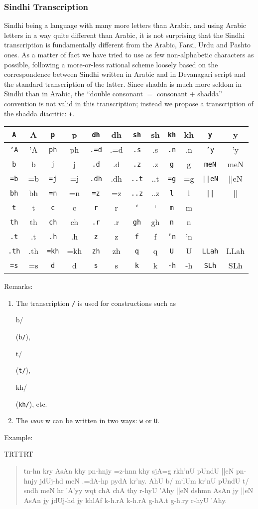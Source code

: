 \documentclass[a4paper,11pt]{article}
\def\shortarab#1{{\pushocplist\ArabicOCP\fontfamily{omarb}\selectfont#1\popocplist}}
\def\shortsindhi#1{{\pushocplist\SindhiOCP\fontfamily{omarb}\selectfont#1\popocplist}}
\def\stl#1#2#3#4#5#6{\hline\rule[-5pt]{0pt}{14pt}\texttt{#1}&\shortsindhi{#1}&\texttt{#2}&\shortsindhi{#2}&\texttt{#3}&\shortsindhi{#3}&
\texttt{#4}&\shortsindhi{#4}&\texttt{#5}&\shortsindhi{#5}&\texttt{#6}&\shortsindhi{#6}\\}
\begin{document}
\subsubsection{Sindhi Transcription}

Sindhi being a language with many more letters than Arabic, and using
Arabic letters in a way quite different than Arabic, it is not
surprising that the Sindhi transcription is fundamentally different
from the Arabic, Farsi, Urdu and Pashto ones. As a matter of fact we
have tried to use as few non-alphabetic characters as possible,
following a more-or-less rational scheme loosely based on the
correspondence between Sindhi written in Arabic and in Devanagari
script and the standard transcription of the latter.  Since shadda is
much more seldom in Sindhi than in Arabic, the ``double consonant $=$
consonant $+$ shadda'' convention is not valid in this transcription;
instead we propose a transcription of the shadda diacritic:
\texttt{+}.

\begin{center}
\begin{tabular}{|c|c||c|c||c|c||c|c||c|c||c|c|}
\stl{A}{p}{dh}{sh}{kh}{y}
\stl{'A}{ph}{.=d}{.s}{.n}{'y}
\stl{b}{j}{.d}{.z}{g}{meN}
\stl{=b}{=j}{.dh}{..t}{=g}{||eN}
\stl{bh}{=n}{=z}{..z}{l}{||}
\stl{t}{c}{r}{`}{m}{}
\stl{th}{ch}{.r}{gh}{n}{}
\stl{.t}{.h}{z}{f}{'n}{}
\stl{.th}{=kh}{zh}{q}{U}{LLah}
\stl{=s}{d}{s}{k}{-h}{SLh}
\hline
\end{tabular}
\end{center}

\noindent
Remarks:

\begin{enumerate}
\item The transcription \texttt{/} is used for constructions such as
\begin{sindhi}b/\end{sindhi} (\texttt{b/}),
\begin{sindhi}t/\end{sindhi} (\texttt{t/}), \begin{sindhi}kh/\end{sindhi}
(\texttt{kh/}), etc.
\item The \emph{waw} \shortarab{w} can be written in two ways:
\texttt{w} or \texttt{U}.
\end{enumerate}
  
\noindent
Example:

{\pardir TRT\textdir TRT
\begin{quote}
\pushocplist\SindhiOCP{}\selectfont tn-hn kry AsAn khy
pn-hnjy =z-hnn khy sjA=g rkh'nU pUndU ||eN pn-hnjy jdUj-hd meN .=dA-hp
pydA kr'ny. AhU b/ m`lUm kr'nU pUndU t/ sndh meN hr 'A'yy wqt chA chA
thy r-hyU 'Ahy ||eN dshmn AsAn jy ||eN AsAn jy jdUj-hd jy khlAf k-h.rA
k-h.rA g-hA.t g-h.ry r-hyU 'Ahy.  \popocplist
\end{quote}}
\end{document}
